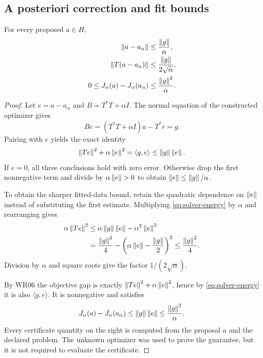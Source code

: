 \subsection{A posteriori correction and fit bounds}
\begin{theorem}\label{WR13}
For every proposed $a\in H$,
\begin{align}
 \left\lVert a-a_\alpha\right\rVert&\le\frac{\left\lVert g\right\rVert}{\alpha},\label{eq:solver-error}\\
 \left\lVert T(a-a_\alpha)\right\rVert&\le\frac{\left\lVert g\right\rVert}{2\sqrt\alpha},\label{eq:solver-fit}\\
 0\le J_\alpha(a)-J_\alpha(a_\alpha)&\le\frac{\left\lVert g\right\rVert^2}{\alpha}.
 \label{eq:solver-objective}
\end{align}
\end{theorem}
\begin{proof}
Let $e=a-a_\alpha$ and $B=T^*T+\alpha I$. The normal equation of the constructed optimizer gives
\[
 Be=(T^*T+\alpha I)a-T^*r=g.
\]
Pairing with $e$ yields the exact identity
\begin{equation}\label{eq:solver-energy}
 \left\lVert Te\right\rVert^2+\alpha\left\lVert e\right\rVert^2=\langle g,e\rangle
 \le\left\lVert g\right\rVert\left\lVert e\right\rVert.
\end{equation}
If $e=0$, all three conclusions hold with zero error. Otherwise drop the first nonnegative term and divide by $\alpha\left\lVert e\right\rVert>0$ to obtain $\left\lVert e\right\rVert\le\left\lVert g\right\rVert/\alpha$.

To obtain the sharper fitted-data bound, retain the quadratic dependence on $\left\lVert e\right\rVert$ instead of substituting the first estimate. Multiplying \eqref{eq:solver-energy} by $\alpha$ and rearranging gives
\[
\begin{aligned}
 \alpha\left\lVert Te\right\rVert^2
 &\le\alpha\left\lVert g\right\rVert\left\lVert e\right\rVert-\alpha^2\left\lVert e\right\rVert^2\\
 &=\frac{\left\lVert g\right\rVert^2}{4}
     -\left(\alpha\left\lVert e\right\rVert-\frac{\left\lVert g\right\rVert}{2}\right)^2
 \le\frac{\left\lVert g\right\rVert^2}{4}.
\end{aligned}
\]
Division by $\alpha$ and square roots give the factor $1/(2\sqrt\alpha)$.

By WR06 the objective gap is exactly $\left\lVert Te\right\rVert^2+\alpha\left\lVert e\right\rVert^2$, hence by \eqref{eq:solver-energy} it is also $\langle g,e\rangle$. It is nonnegative and satisfies
\[
 J_\alpha(a)-J_\alpha(a_\alpha)
 \le\left\lVert g\right\rVert\left\lVert e\right\rVert\le\frac{\left\lVert g\right\rVert^2}{\alpha}.
\]
Every certificate quantity on the right is computed from the proposal $a$ and the declared problem. The unknown optimizer was used to prove the guarantee, but it is not required to evaluate the certificate.
\end{proof}

